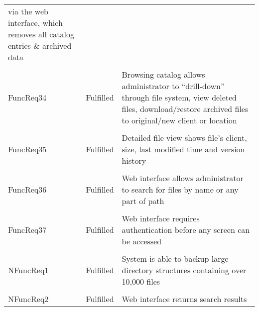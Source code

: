 \begin{longtable}{ l l p{5cm} }
                                                      via the web interface,
                                                      which removes all catalog
                                                      entries \& archived data
    \\ \\
    FuncReq34           & Fulfilled                 & Browsing catalog allows
                                                      administrator to
                                                      ``drill-down'' through
                                                      file system, view deleted
                                                      files, download/restore
                                                      archived files to
                                                      original/new client or
                                                      location
    \\ \\
    FuncReq35           & Fulfilled                 & Detailed file view shows
                                                      file's client, size, last
                                                      modified time and version
                                                      history
    \\ \\
    FuncReq36           & Fulfilled                 & Web interface allows
                                                      administrator to search
                                                      for files by name or any
                                                      part of path
    \\ \\
    FuncReq37           & Fulfilled                 & Web interface requires
                                                      authentication before any
                                                      screen can be accessed
    \\ \\
    NFuncReq1           & Fulfilled                 & System is able to backup
                                                      large directory
                                                      structures containing
                                                      over 10,000 files
    \\ \\
    NFuncReq2           & Fulfilled                 & Web interface returns
                                                      search results

\end{longtable}
